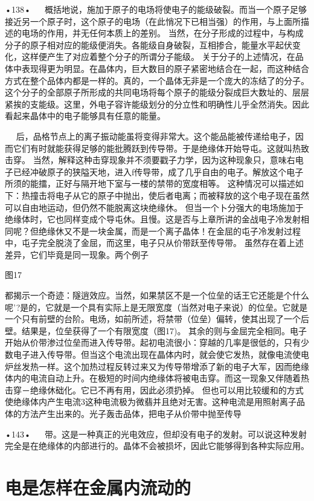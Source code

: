 •138•
  
概括地说，施加于原子的电场将使电子的能级破裂。而当一个原子足够接近另一个原子时，这个原子的电场（在此悄况下已相当强）的作用，与上面所描述的电场的作用，并无任何本质上的差别。
当然，在分子形成的过程中，与构成分子的原子相对应的能级便消失。各能级自身破裂，互相掺合，能量水平起伏变化，这样便产生了对应着整个分子的所谓分子能级。
关于分子的上述情况，在品体中表现得更为明显。在晶体内，巨大数目的原子紧密地结合在一起，而这种结合方式在整个品体内都是一样的。真的，一个晶体无非是一个庞大的冻结了的分子。
这个分子的全部原子所形成的共同电场将每个原子的能级分裂成巨大数址的、层层紧挨的支能级。这里，外电子容许能级划分的分立性和明确性儿乎全然消失。因此看起来晶体中的电子能够具有任意的能量。

 
  
后，品格节点上的离子振动能虽将变得非常大。这个能品能被传递给电子，因而它们有时就能获得足够的能批腾跃到传导带。于是绝缘体开始导屯。这就叫热致击穿。
当然，解释这种击穿现象并不须要戳子力学，因为这种现象只，意味右电子已经冲破原子的狭隘天地，进入f传导带，成了几乎自由的电子。解放这个电子所须的能擂，正好与隔开地下室与一楼的禁带的宽度相等。
这种情况可以描述如下：热撞击将电子从它的原子中抛出，使后者电离；而被释放的这个电子现在虽然可以自由地运动，但仍然不能脱离这块绝缘休。
但当一个卜分强大的电场施加于绝缘体时，它也同样变成个导屯休。且慢。这是否与上章所讲的金战电子冷发射相同呢？但绝缘休又不是一块金属，而是一个离子晶体！在金屈的屯子冷发射过程中，屯子完全脱浇了金屈，而这里，电子只从价带跃至传导带。
虽然存在着上述差异，它们毕竟是同一现象。两个例子

图17

都揭示一个奇迹：隧逍效应。当然，如果禁区不是一个位垒的话王它还能是个什么呢'?是的，它就是一个具有实际上是无限宽度（当然对电子来说）的位垒。它就是一个只有前壁的台阶。电炀，如前所述，将禁带（位垒）偏转，使其出现了一个后壁。结果是，位垒获得了一个有限宽度（图17)。
其余的则与金屈完全相同。电子开始从价带渗过位垒而进入传导带。起初电流很小：穿越的几率是很低的，只有少数电子进入传导带。但当这个电流出现在晶体内时，就会使它发热，就像电流使电炉丝发热一样。这个加热过程反转过来又为传导带增添了新的电子大军，因而绝缘体内的电流自动上升。在极短的时间内绝缘体将被电击穿。而这一现象又伴随着热击穿－绝缘休础化。它已不再有用，因此必须扔掉。
但也可以用比较缓和的方式使绝缘体内产生电流3这种电流极为微翡并且绝对无害。这种电流是用照射离子品体的方法产生出来的。光子轰击品体，把电子从价带中抛至传导

•143•
  
带。这是一种真正的光电效应，但却没有电子的发射。可以说这种发射完全是在绝缘体的内部进行的。晶体不会被损坏，因此它能够得到各种实际应用。

\section{电是怎样在金属内流动的}

